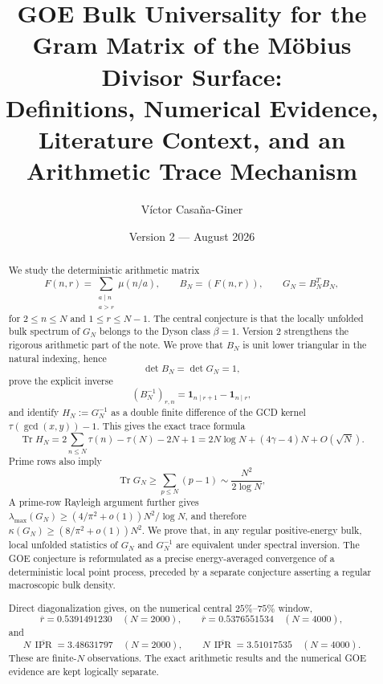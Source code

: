 \documentclass[11pt]{amsart}
\title[GOE Bulk Universality for the M\"obius Divisor Surface]{GOE Bulk Universality for the Gram Matrix of the M\"obius Divisor Surface:\\
Definitions, Numerical Evidence, Literature Context, and an Arithmetic Trace Mechanism}
\author{V\'ictor Casa\~na-Giner}
\date{Version 2 --- August 2026}
\numberwithin{equation}{section}
\theoremstyle{plain}
\theoremstyle{definition}
\theoremstyle{remark}
\newcommand{\mob}{\mu}
\newcommand{\Tr}{\operatorname{Tr}}
\newcommand{\IPR}{\operatorname{IPR}}
\begin{document}
\begin{abstract}
We study the deterministic arithmetic matrix
\begin{equation}
F(n,r)=\sum_{\substack{a\mid n\\ a>r}}\mob(n/a),
\qquad
B_N=(F(n,r)),
\qquad
G_N=B_N^TB_N,
\label{eq:abstract_surface}
\end{equation}
for $2\le n\le N$ and $1\le r\le N-1$.  The central conjecture is that the locally unfolded bulk spectrum of $G_N$ belongs to the Dyson class $\beta=1$.  Version 2 strengthens the rigorous arithmetic part of the note.  We prove that $B_N$ is unit lower triangular in the natural indexing, hence
\begin{equation}
\det B_N=\det G_N=1,
\label{eq:abstract_unimodular}
\end{equation}
prove the explicit inverse
\begin{equation}
(B_N^{-1})_{r,n}=\mathbf 1_{n\mid r+1}-\mathbf 1_{n\mid r},
\label{eq:abstract_inverse}
\end{equation}
and identify $H_N:=G_N^{-1}$ as a double finite difference of the GCD kernel $\tau(\gcd(x,y))-1$.  This gives the exact trace formula
\begin{equation}
\Tr H_N
=2\sum_{n\le N}\tau(n)-\tau(N)-2N+1
=2N\log N+(4\gamma-4)N+O(\sqrt N).
\label{eq:abstract_inverse_trace}
\end{equation}
Prime rows also imply
\begin{equation}
\Tr G_N\ge \sum_{p\le N}(p-1)
\sim \frac{N^2}{2\log N},
\label{eq:abstract_trace_lower}
\end{equation}
A prime-row Rayleigh argument further gives $\lambda_{\max}(G_N)\ge(4/\pi^2+o(1))N^2/\log N$, and therefore $\kappa(G_N)\ge(8/\pi^2+o(1))N^2$.  We prove that, in any regular positive-energy bulk, local unfolded statistics of $G_N$ and $G_N^{-1}$ are equivalent under spectral inversion.  The GOE conjecture is reformulated as a precise energy-averaged convergence of a deterministic local point process, preceded by a separate conjecture asserting a regular macroscopic bulk density.

Direct diagonalization gives, on the numerical central $25\%$--$75\%$ window,
\begin{equation}
\overline r=0.5391491230\quad(N=2000),
\qquad
\overline r=0.5376551534\quad(N=4000),
\label{eq:abstract_gap_ratios}
\end{equation}
and
\begin{equation}
N\,\overline{\IPR}=3.48631797\quad(N=2000),
\qquad
N\,\overline{\IPR}=3.51017535\quad(N=4000).
\label{eq:abstract_ipr}
\end{equation}
These are finite-$N$ observations.  The exact arithmetic results and the numerical GOE evidence are kept logically separate.
\end{abstract}
\end{document}
